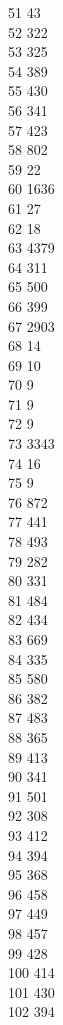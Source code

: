 { 51	43 \\
 52	322 \\
 53	325 \\
 54	389 \\
 55	430 \\
 56	341 \\
 57	423 \\
 58	802 \\
 59	22 \\
 60	1636 \\
 61	27 \\
 62	18 \\
 63	4379 \\
 64	311 \\
 65	500 \\
 66	399 \\
 67	2903 \\
 68	14 \\
 69	10 \\
 70	9 \\
 71	9 \\
 72	9 \\
 73	3343 \\
 74	16 \\
 75	9 \\
 76	872 \\
 77	441 \\
 78	493 \\
 79	282 \\
 80	331 \\
 81	484 \\
 82	434 \\
 83	669 \\
 84	335 \\
 85	580 \\
 86	382 \\
 87	483 \\
 88	365 \\
 89	413 \\
 90	341 \\
 91	501 \\
 92	308 \\
 93	412 \\
 94	394 \\
 95	368 \\
 96	458 \\
 97	449 \\
 98	457 \\
 99	428 \\
 100	414 \\
 101	430 \\
 102	394 \\
}
